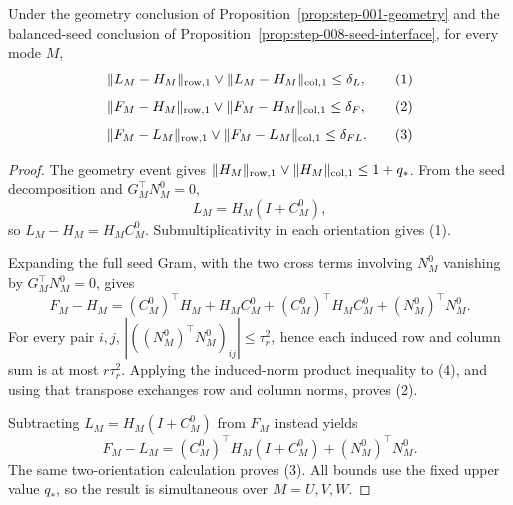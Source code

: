 \begin{lemma}\label{lem:step-009-raw-expansion}
Under the geometry conclusion of Proposition~\ref{prop:step-001-geometry}
and the balanced-seed conclusion of Proposition~\ref{prop:step-008-seed-interface},
for every mode \(M\),
\[
\|L_M-H_M\|_{\rm row,1}\vee\|L_M-H_M\|_{\rm col,1}\le\delta_L, \tag{1}
\]
\[
\|F_M-H_M\|_{\rm row,1}\vee\|F_M-H_M\|_{\rm col,1}\le\delta_F, \tag{2}
\]
\[
\|F_M-L_M\|_{\rm row,1}\vee\|F_M-L_M\|_{\rm col,1}\le\delta_{FL}. \tag{3}
\]

\begin{proof}

The geometry event gives
\(\|H_M\|_{\rm row,1}\vee\|H_M\|_{\rm col,1}\le1+q_*\). From the seed
decomposition and \(G_M^\top N_M^0=0\),
\[
L_M=H_M(I+C_M^0),
\]
so \(L_M-H_M=H_MC_M^0\). Submultiplicativity in each orientation gives
(1).

Expanding the full seed Gram, with the two cross terms involving \(N_M^0\)
vanishing by \(G_M^\top N_M^0=0\), gives
\[
F_M-H_M=(C_M^0)^\top H_M+H_MC_M^0
 +(C_M^0)^\top H_MC_M^0+(N_M^0)^\top N_M^0. \tag{4}
\]
For every pair \(i,j\),
\(\left|((N_M^0)^\top N_M^0)_{ij}\right|\le\tau_r^2\), hence each induced row and
column sum is at most \(r\tau_r^2\). Applying the induced-norm product
inequality to (4), and using that transpose exchanges row and column norms,
proves (2).

Subtracting \(L_M=H_M(I+C_M^0)\) from \(F_M\) instead yields
\[
F_M-L_M=(C_M^0)^\top H_M(I+C_M^0)+(N_M^0)^\top N_M^0. \tag{5}
\]
The same two-orientation calculation proves (3). All bounds use the fixed
upper value \(q_*\), so the result is simultaneous over \(M=U,V,W\).



\end{proof}
\end{lemma}

